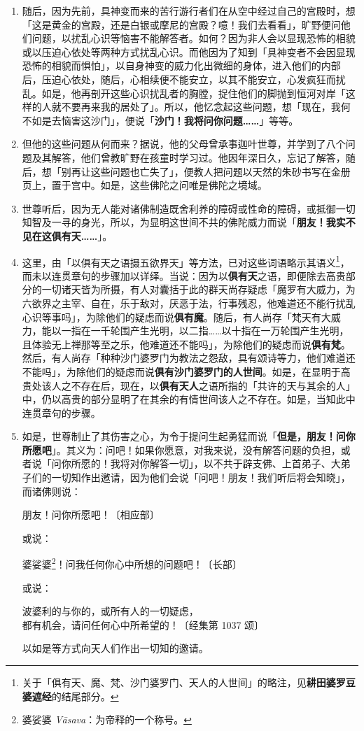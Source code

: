 \begin{enumerate}\item 随后，因为先前，具神变而来的苦行游行者们在从空中经过自己的宫殿时，想「这是黄金的宫殿，还是白银或摩尼的宫殿？噫！我们去看看」，旷野便问他们问题，以扰乱心识等恼害不能解答者。如何？因为非人会以显现恐怖的相貌或以压迫心依处等两种方式扰乱心识。而他因为了知到「具神变者不会因显现恐怖的相貌而惧怕」，以自身神变的威力化出微细的身体，进入他们的内部后，压迫心依处，随后，心相续便不能安立，以其不能安立，心发疯狂而扰乱。如是，他再剖开这些心识扰乱者的胸膛，捉住他们的脚抛到恒河对岸「这样的人就不要再来我的居处了」。所以，他忆念起这些问题，想「现在，我何不如是去恼害这沙门」，便说「\textbf{沙门！我将问你问题……}」等等。
\item 但他的这些问题从何而来？据说，他的父母曾承事迦叶世尊，并学到了八个问题及其解答，他们曾教旷野在孩童时学习过。他因年深日久，忘记了解答，随后，想「别再让这些问题也亡失了」，便教人把问题以天然的朱砂书写在金册页上，置于宫中。如是，这些佛陀之问唯是佛陀之境域。
\item 世尊听后，因为无人能对诸佛制造既舍利养的障碍或性命的障碍，或抵御一切知智及一寻的身光，所以，为显明这世间不共的佛陀威力而说「\textbf{朋友！我实不见在这俱有天……}」。
\item 这里，由「以俱有天之语摄五欲界天」等方法，已对这些词语略示其语义\footnote{关于「俱有天、魔、梵、沙门婆罗门、天人的人世间」的略注，见\textbf{耕田婆罗豆婆遮经}的结尾部分。}，而未以连贯章句的步骤加以详绎。当说：因为以\textbf{俱有天}之语，即便除去高贵部分的一切诸天皆为所摄，有人对囊括于此的群天尚存疑虑「魔罗有大威力，为六欲界之主宰、自在，乐于敌对，厌恶于法，行事残忍，他难道还不能行扰乱心识等事吗」，为除他们的疑虑而说\textbf{俱有魔}。随后，有人尚存「梵天有大威力，能以一指在一千轮围产生光明，以二指……以十指在一万轮围产生光明，且体验无上禅那等至之乐，他难道还不能吗」，为除他们的疑虑而说\textbf{俱有梵}。然后，有人尚存「种种沙门婆罗门为教法之怨敌，具有颂诗等力，他们难道还不能吗」，为除他们的疑虑而说\textbf{俱有沙门婆罗门的人世间}。如是，在显明于高贵处该人之不存在后，现在，以\textbf{俱有天人}之语所指的「共许的天与其余的人」中，仍以高贵的部分显明了在其余的有情世间该人之不存在。如是，当知此中连贯章句的步骤。
\item 如是，世尊制止了其伤害之心，为令于提问生起勇猛而说「\textbf{但是，朋友！问你所愿吧}」。其义为：问吧！如果你愿意，对我来说，没有解答问题的负担，或者说「问你所愿的！我将对你解答一切」，以不共于辟支佛、上首弟子、大弟子们的一切知作出邀请，因为他们会说「问吧！朋友！我们听后将会知晓」，而诸佛则说：\begin{quoting}朋友！问你所愿吧！{\bluefootnotesize 〔相应部〕}\end{quoting}或说：\begin{quoting}婆娑婆\footnote{婆娑婆 \textit{Vāsava}：为帝释的一个称号。}！问我任何你心中所想的问题吧！{\bluefootnotesize 〔长部〕}\end{quoting}或说：\begin{quoting}波婆利的与你的，或所有人的一切疑虑，\\都有机会，请问任何心中所希望的！{\bluefootnotesize 〔经集第 1037 颂〕}\end{quoting}以如是等方式向天人们作出一切知的邀请。

\end{enumerate}
